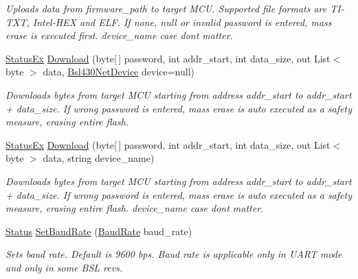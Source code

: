 \begin{DoxyCompactItemize}
\begin{DoxyCompactList}\small\item\em Uploads data from firmware\+\_\+path to target M\+CU. Supported file formats are T\+I-\/\+T\+XT, Intel-\/\+H\+EX and E\+LF. If none, null or invalid password is entered, mass erase is executed first. device\+\_\+name case dont matter. \end{DoxyCompactList}\item 
\mbox{\hyperlink{class_b_s_l430___n_e_t_1_1_status_ex}{Status\+Ex}} \mbox{\hyperlink{class_b_s_l430___n_e_t_1_1_b_s_l430_n_e_t_a76453c32bcc4006f08720bbede236583}{Download}} (byte\mbox{[}$\,$\mbox{]} password, int addr\+\_\+start, int data\+\_\+size, out List$<$ byte $>$ data, \mbox{\hyperlink{class_b_s_l430___n_e_t_1_1_bsl430_net_device}{Bsl430\+Net\+Device}} device=null)
\begin{DoxyCompactList}\small\item\em Downloads bytes from target M\+CU starting from address \textquotesingle{}addr\+\_\+start\textquotesingle{} to \textquotesingle{}addr\+\_\+start\textquotesingle{} + \textquotesingle{}data\+\_\+size\textquotesingle{}. If wrong password is entered, mass erase is auto executed as a safety measure, erasing entire flash. \end{DoxyCompactList}\item 
\mbox{\hyperlink{class_b_s_l430___n_e_t_1_1_status_ex}{Status\+Ex}} \mbox{\hyperlink{class_b_s_l430___n_e_t_1_1_b_s_l430_n_e_t_ad7b703fdca5e09026e64027bf5947848}{Download}} (byte\mbox{[}$\,$\mbox{]} password, int addr\+\_\+start, int data\+\_\+size, out List$<$ byte $>$ data, string device\+\_\+name)
\begin{DoxyCompactList}\small\item\em Downloads bytes from target M\+CU starting from address \textquotesingle{}addr\+\_\+start\textquotesingle{} to \textquotesingle{}addr\+\_\+start\textquotesingle{} + \textquotesingle{}data\+\_\+size\textquotesingle{}. If wrong password is entered, mass erase is auto executed as a safety measure, erasing entire flash. device\+\_\+name case dont matter. \end{DoxyCompactList}\item 
\mbox{\hyperlink{class_b_s_l430___n_e_t_1_1_status}{Status}} \mbox{\hyperlink{class_b_s_l430___n_e_t_1_1_b_s_l430_n_e_t_a6d01c3021cc44318ab8ee695a910ecfd}{Set\+Baud\+Rate}} (\mbox{\hyperlink{namespace_b_s_l430___n_e_t_a8d30c263598635a481840944d38aeb70}{Baud\+Rate}} baud\+\_\+rate)
\begin{DoxyCompactList}\small\item\em Sets baud rate. Default is 9600 bps. Baud rate is applicable only in U\+A\+RT mode and only in some B\+SL revs. \end{DoxyCompactList}\item 

\end{DoxyCompactItemize}
